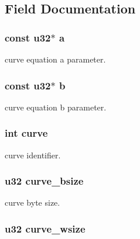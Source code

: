 \subsection{Field Documentation}
\hypertarget{struct__t__curve_a88955062c39051a3125096467bc4ab29}{
\subsubsection[{a}]{\setlength{\rightskip}{0pt plus 5cm}const u32$\ast$ a}}\label{struct__t__curve_a88955062c39051a3125096467bc4ab29}
curve equation a parameter. \hypertarget{struct__t__curve_a8b6702ad371684048f47db647567c59f}{
\subsubsection[{b}]{\setlength{\rightskip}{0pt plus 5cm}const u32$\ast$ b}}\label{struct__t__curve_a8b6702ad371684048f47db647567c59f}
curve equation b parameter. \hypertarget{struct__t__curve_ad61e4ff482e52b3da8c2f5e13dc3c73d}{
\subsubsection[{curve}]{\setlength{\rightskip}{0pt plus 5cm}int curve}}\label{struct__t__curve_ad61e4ff482e52b3da8c2f5e13dc3c73d}
curve identifier. \hypertarget{struct__t__curve_a9bbec58f3c4e0242f4a35e5a074e8157}{
\subsubsection[{curve\+\_\+bsize}]{\setlength{\rightskip}{0pt plus 5cm}u32 curve\+\_\+bsize}}\label{struct__t__curve_a9bbec58f3c4e0242f4a35e5a074e8157}
curve byte size. \hypertarget{struct__t__curve_a197249f7a6676b30ff0a587d2840d6bb}{
\subsubsection[{curve\+\_\+wsize}]{\setlength{\rightskip}{0pt plus 5cm}u32 curve\+\_\+wsize}}\label{struct__t__curve_a197249f7a6676b30ff0a587d2840d6bb}
